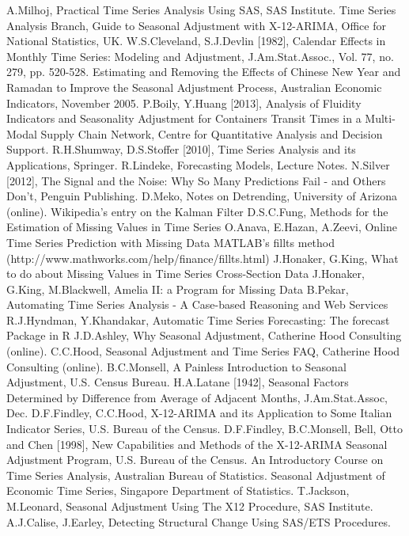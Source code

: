 \newpage{}
\begin{thebibliography}{99}
 A.Milhoj, Practical Time Series Analysis Using SAS, SAS Institute. 
 Time Series Analysis Branch, Guide to Seasonal Adjustment with X-12-ARIMA,  Office for National Statistics, UK. 
 W.S.Cleveland, S.J.Devlin [1982], Calendar Effects in Monthly Time Series: Modeling and Adjustment, J.Am.Stat.Assoc., Vol. 77, no. 279, pp. 520-528.
 Estimating and Removing the Effects of Chinese New Year and Ramadan to Improve the Seasonal Adjustment Process, Australian Economic Indicators, November 2005.
 P.Boily, Y.Huang [2013], Analysis of Fluidity Indicators and Seasonality Adjustment for Containers Transit Times in a Multi-Modal Supply Chain Network, Centre for Quantitative Analysis and Decision Support. 
 R.H.Shumway, D.S.Stoffer [2010], Time Series Analysis and its Applications, Springer.
 R.Lindeke, Forecasting Models, Lecture Notes.
 N.Silver [2012], The Signal and the Noise: Why So Many Predictions Fail - and Others Don't, Penguin Publishing.
 D.Meko, Notes on Detrending, University of Arizona (online).
 Wikipedia's entry on the Kalman Filter 
 D.S.C.Fung, Methods for the Estimation of Missing Values in Time Series    
 O.Anava, E.Hazan, A.Zeevi, Online Time Series Prediction with Missing Data 
 MATLAB's fillts method (http://www.mathworks.com/help/finance/fillts.html)
 J.Honaker, G.King, What to do about Missing Values in Time Series Cross-Section Data
 J.Honaker, G.King, M.Blackwell, Amelia II: a Program for Missing Data 
 B.Pekar, Automating Time Series Analysis - A Case-based Reasoning and Web Services  R.J.Hyndman, Y.Khandakar, Automatic Time Series Forecasting: The forecast Package in R 
 J.D.Ashley, Why Seasonal Adjustment, Catherine Hood Consulting (online).
 C.C.Hood, Seasonal Adjustment and Time Series FAQ, Catherine Hood Consulting (online).
 B.C.Monsell, A Painless Introduction to Seasonal Adjustment, U.S. Census Bureau.
 H.A.Latane [1942], Seasonal Factors Determined by Difference from Average of Adjacent Months, J.Am.Stat.Assoc, Dec.
 D.F.Findley, C.C.Hood, X-12-ARIMA and its Application to Some Italian Indicator Series,  U.S. Bureau of the Census.
 D.F.Findley, B.C.Monsell, Bell, Otto and Chen [1998], New Capabilities and Methods of the X-12-ARIMA Seasonal Adjustment Program, U.S. Bureau of the Census. 
 An Introductory Course on Time Series Analysis, Australian Bureau of Statistics. 
 Seasonal Adjustment of Economic Time Series, Singapore Department of Statistics.
 T.Jackson, M.Leonard, Seasonal Adjustment Using The X12 Procedure, SAS Institute.
 A.J.Calise, J.Earley, Detecting Structural Change Using SAS/ETS Procedures.


\end{thebibliography}
